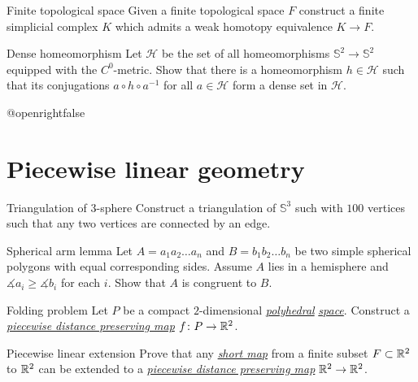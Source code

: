 \documentclass[twoside]{book}
\begin{document}
{\begin{pr}{\easy}{Finite topological space}\label{Finite topological space}
Given a finite topological space $F$ 
construct a finite simplicial complex $K$
which admits a weak homotopy equivalence  $K\to F$. 
\end{pr}

\begin{pr}{\easy}{Dense homeomorphism}\label{Dense homeomorphism}
Let $\mathcal{H}$ be the set of all homeomorphisms $\mathbb {S}^2\to\mathbb {S}^2$ 
equipped with the $C^0$-metric.
Show that there is a homeomorphism $h\in \mathcal{H}$ such that its conjugations $a\circ h\circ a^{-1}$ for all $a\in\mathcal{H}$ form a dense set in $\mathcal{H}$.
 
\end{pr}











\csname @openrightfalse\endcsname
\chapter{Piecewise linear geometry}



\begin{pr}{}{Triangulation of 3-sphere}\label{4-poly}
Construct a triangulation of $\mathbb{S}^3$ 
such with $100$ vertices
such that any two vertices are connected by an edge.
\end{pr}

\begin{pr}{}{Spherical arm lemma}\label{Spherical arm lemma}
Let $A=a_1a_2\dots a_n$ and $B=b_1b_2\dots b_n$ be two simple spherical polygons 
with equal corresponding sides.
Assume $A$ lies in a hemisphere and $\measuredangle a_i\ge\measuredangle b_i$ for each $i$.
Show that $A$ is congruent to $B$.
\end{pr}



\begin{pr}{}{Folding problem} \label{Folding problem}
Let $P$ be a compact $2$-dimensional 
\hyperref[Polyhedral space]{\emph{polyhedral}}
\hyperref[Polyhedral space]{\emph{space}}. 
Construct a 
\hyperref[Piecewise distance preserving map]{\emph{piecewise distance preserving map}} 
$f\colon P\to \mathbb{R}^2$.
\end{pr}

\begin{pr}{}{Piecewise linear extension} \label{iso-kirzhbraun}
Prove that any \hyperref[Short map]{\emph{short map}} from a finite subset $F\subset \mathbb{R}^2$
to 
$\mathbb{R}^2$ can be extended to a 
\hyperref[Piecewise distance preserving map]{\emph{piecewise distance preserving map}} 
$\mathbb{R}^2\to\mathbb{R}^2$.
\end{pr}


}
\end{document}
